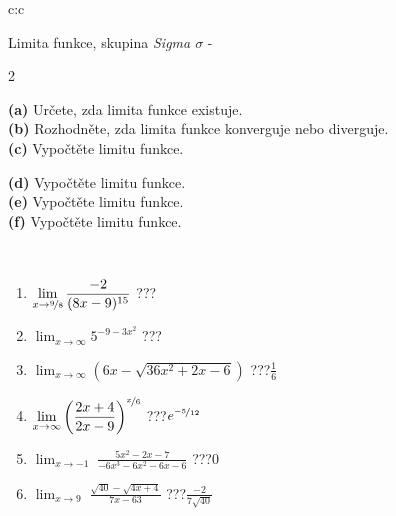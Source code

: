 \documentclass[10pt]{report}
\begin{document}
\newpage
\thispagestyle{empty}
\begin{tabular}{c:c}
\begin{minipage}[c][104.5mm][t]{0.5\linewidth}
\begin{center}
\vspace{7mm}
{\huge Limita funkce, skupina \textit{Sigma $\sigma$} -}\\[5mm]
\begin{minipage}{0.95\linewidth}
\begin{center}
{\small \begin{multicols}{2} \raggedright
\textbf{(a)} Určete, zda limita funkce existuje. \\[1mm]
\textbf{(b)} Rozhodněte, zda limita funkce konverguje nebo diverguje. \\[1mm]
\textbf{(c)} Vypočtěte limitu funkce. \par \columnbreak
\textbf{(d)} Vypočtěte limitu funkce. \\[1mm]
\textbf{(e)} Vypočtěte limitu funkce. \\[1mm]
\textbf{(f)} Vypočtěte limitu funkce. \\[1mm]
\end{multicols}
}
\end{center}
\end{minipage}
\\[4mm]
\begin{minipage}{0.79\linewidth}
\begin{center}
\begin{varwidth}{\linewidth}
\begin{enumerate}
\normalsize
\item $\displaystyle\lim_{x\to\nicefrac{9}{8}}{\frac{-2}{(8x-9)^{15}}}$\quad \dotfill\; ???\;\dotfill \quad {}
\item $\displaystyle\lim_{x\to\infty}{5^{-9-3x^2}}$\quad \dotfill\; ???\;\dotfill \quad {}
\item $\displaystyle\lim_{x\to\infty}{\left(6x - \sqrt{36x^2+2x-6}\right)}$\quad \dotfill\; ???\;\dotfill \quad $\frac{1}{6}$
\item $\displaystyle\lim_{x\to\infty}{\left( \frac{2x+4}{2x-9} \right)^{\nicefrac{x}{6}}}$\quad \dotfill\; ???\;\dotfill \quad $e^{\nicefrac{-5}{12}}$
\item $\displaystyle\lim_{x\to -1}{\;\frac{5x^2-2x-7}{-6x^3-6x^2-6x-6}}$\quad \dotfill\; ???\;\dotfill \quad $0$
\item $\displaystyle\lim_{x\to 9}{\;\frac{\sqrt{40}-\sqrt{4x+4}}{7x-63}}$\quad \dotfill\; ???\;\dotfill \quad $\frac{-2}{7\sqrt{40}}$

\end{enumerate}
\end{varwidth}
\end{center}
\end{minipage}
\end{center}
\end{minipage}
\end{tabular}
\end{document}
